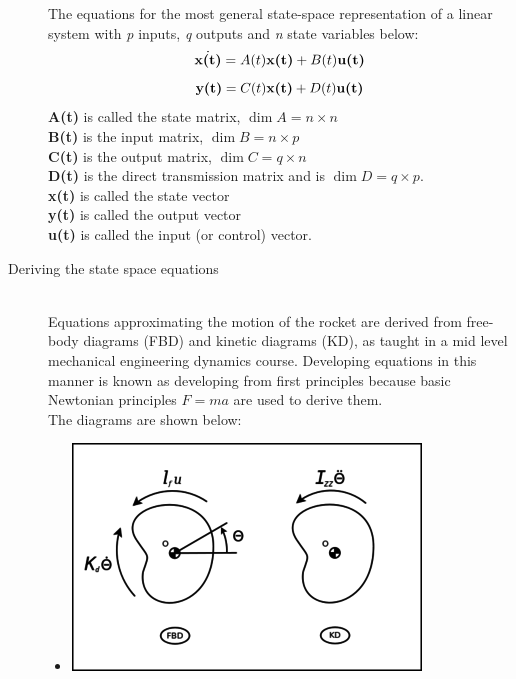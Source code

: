 \documentclass[12pt]{article}
\begin{document}
\begin{description}
		The equations for the most general state-space representation of a linear system with \textit{p} inputs, \textit{q} outputs and \textit{n} state variables below:\\
			\begin{equation}
				\dot{\textbf{x(t)}} = A(t)\textbf{x(t)} + B(t)\textbf{u(t)}\\
			\end{equation}
			\begin{equation}
				\textbf{y(t)} = C(t)\textbf{x(t)} + D(t)\textbf{u(t)}\\
			\end{equation}
		\textbf{A(t)} is called the state matrix, $\dim{A} = n \times n$\\
		\textbf{B(t)} is the input matrix, $\dim{B} = n \times p$\\
		\textbf{C(t)} is the output matrix, $\dim{C} = q \times n$\\
		\textbf{D(t)} is the direct transmission matrix and is $\dim{D} = q \times p$.\\
		\textbf{x(t)} is called the state vector\\
		\textbf{y(t)} is called the output vector\\
		\textbf{u(t)} is called the input (or control) vector.\\

		\item [Deriving the state space equations] \hfill \\
		Equations approximating the motion of the rocket are derived from free-body diagrams (FBD) and kinetic diagrams (KD), as taught in a mid level mechanical engineering dynamics course. Developing equations in this manner is known as developing from first principles because basic Newtonian principles $F=ma$ are used to derive them. \cite{PSAS} \\
		
		The diagrams are shown below:
		\begin{itemize}
			\item[] \includegraphics[scale=.5]{350x250-RollFBD.png} \\
			

\end{itemize}
\end{description}
\end{document}
